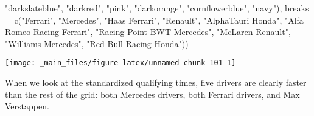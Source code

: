 \documentclass[
]{book}
\newenvironment{Shaded}{\begin{snugshade}}{\end{snugshade}}
\newcommand{\AttributeTok}[1]{\textcolor[rgb]{0.77,0.63,0.00}{#1}}
\newcommand{\FunctionTok}[1]{\textcolor[rgb]{0.00,0.00,0.00}{#1}}
\newcommand{\NormalTok}[1]{#1}
\newcommand{\StringTok}[1]{\textcolor[rgb]{0.31,0.60,0.02}{#1}}
\begin{document}
\begin{Shaded}
\begin{Highlighting}[]
                               \StringTok{"darkslateblue"}\NormalTok{, }
                                \StringTok{"darkred"}\NormalTok{,  }
                                \StringTok{"pink"}\NormalTok{, }
                                \StringTok{"darkorange"}\NormalTok{, }
                                \StringTok{"cornflowerblue"}\NormalTok{,}
                               \StringTok{"navy"}\NormalTok{),}
                     \AttributeTok{breaks =} \FunctionTok{c}\NormalTok{(}\StringTok{"Ferrari"}\NormalTok{,}
                                 \StringTok{"Mercedes"}\NormalTok{,}
                                 \StringTok{"Haas Ferrari"}\NormalTok{,}
                                 \StringTok{"Renault"}\NormalTok{,}
                                 \StringTok{"AlphaTauri Honda"}\NormalTok{,}
                                 \StringTok{"Alfa Romeo Racing Ferrari"}\NormalTok{, }
                                 \StringTok{"Racing Point BWT Mercedes"}\NormalTok{,}
                                 \StringTok{"McLaren Renault"}\NormalTok{,}
                                 \StringTok{"Williams Mercedes"}\NormalTok{,}
                                 \StringTok{"Red Bull Racing Honda"}\NormalTok{))}
\end{Highlighting}
\end{Shaded}

\begin{center}\texttt{[image: \_main\_files/figure-latex/unnamed-chunk-101-1]} \end{center}

When we look at the standardized qualifying times, five drivers are clearly faster than the rest of the grid: both Mercedes drivers, both Ferrari drivers, and Max Verstappen.
\end{document}
